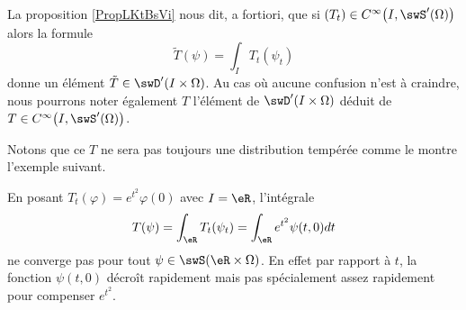 \begin{remark}  \label{RemZYVkHRT}
    La proposition \ref{PropLKtBsVi} nous dit, a fortiori, que si \( (T_t)\in C^{\infty}\big( I,\swS'(\Omega) \big)\) alors la formule
    \begin{equation}
        \tilde T(\psi)=\int_IT_t(\psi_t)
    \end{equation}
    donne un élément \( \tilde T\in\swD'(I\times \Omega)\). Au cas où aucune confusion n'est à craindre, nous pourrons noter également \( T\) l'élément de \( \swD'(I\times \Omega)\) déduit de \( T\in C^{\infty}\big( I,\swS'(\Omega) \big)\).
\end{remark}

Notons que ce \( T\) ne sera pas toujours une distribution tempérée comme le montre l'exemple suivant.

\begin{example}
    En posant \( T_t(\varphi)= e^{t^2}\varphi(0)\) avec \( I=\eR\), l'intégrale
    \begin{equation}
        T(\psi)=\int_{\eR}T_t(\psi_t)=\int_{\eR} e^{t^2}\psi(t,0)dt
    \end{equation}
    ne converge pas pour tout \( \psi\in\swS(\eR\times \Omega)\). En effet par rapport à \( t\), la fonction \( \psi(t,0)\) décroît rapidement mais pas spécialement assez rapidement pour compenser \( e^{t^2}\).
\end{example}
